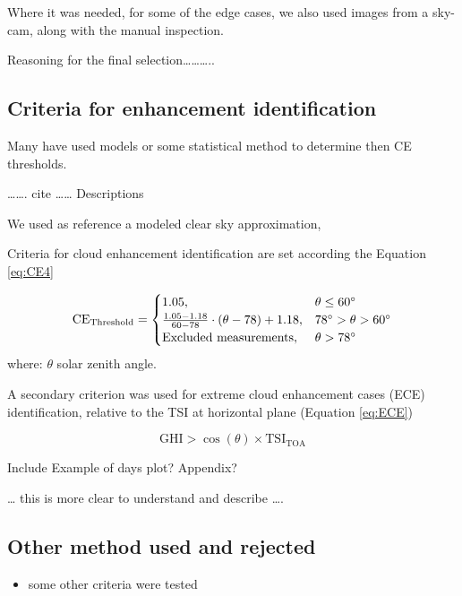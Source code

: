 \documentclass[
]{article}
\providecommand{\tightlist}{%
  \setlength{\itemsep}{0pt}\setlength{\parskip}{0pt}}
\begin{document}
Where it was needed, for some of the edge cases, we also used images from a sky-cam,
along with the manual inspection.

Reasoning for the final selection\ldots\ldots\ldots..

\hypertarget{criteria-for-enhancement-identification}{%
\subsection{Criteria for enhancement identification}\label{criteria-for-enhancement-identification}}

Many have used models or some statistical method to determine then CE thresholds.

\ldots\ldots. cite \ldots\ldots{} Descriptions

We used as reference a modeled clear sky approximation,

Criteria for cloud enhancement identification are set according the Equation \ref{eq:CE4}

\begin{equation}
\text{CE}_\text{Threshold} = \begin{cases}
1.05, & \text{$\theta \leq 60^\circ$}\\
\frac{1.05 - 1.18}{60 - 78} \cdot (\theta- 78) + 1.18 , & \text{$ 78^\circ > \theta > 60^\circ$}\\
\text{Excluded measurements}, & \theta > 78^\circ
\end{cases}\label{eq:CE4}
\end{equation}
where: \(\theta\) solar zenith angle.

A secondary criterion was used for extreme cloud enhancement cases (ECE) identification, relative to the TSI at horizontal plane (Equation \ref{eq:ECE})

\begin{equation}
\text{GHI} > \cos(\theta) \times \text{TSI}_\text{TOA}
\label{eq:ECE}
\end{equation}

Include Example of days plot? Appendix?

\ldots{} this is more clear to understand and describe \ldots.

\hypertarget{other-method-used-and-rejected}{%
\subsection{Other method used and rejected}\label{other-method-used-and-rejected}}

\begin{itemize}
\tightlist
\item
  some other criteria were tested
\end{itemize}
\end{document}

